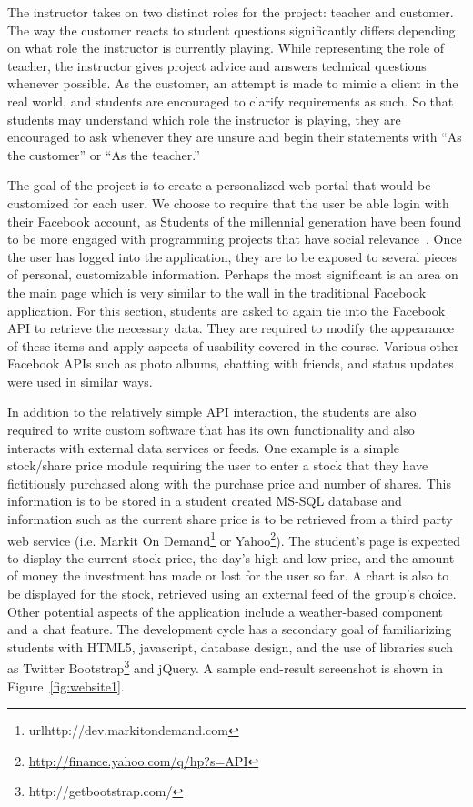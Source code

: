 \documentclass[conference]{IEEEtran}
\begin{document}
The instructor takes on two distinct roles for the project: teacher and customer. The way the customer reacts to student questions significantly differs depending on what role the instructor is currently playing. While representing the role of teacher, the instructor gives project advice and answers technical questions whenever possible. As the customer, an attempt is made to mimic a client in the real world, and students are encouraged to clarify requirements as such. So that students may understand which role the instructor is playing, they are encouraged to ask whenever they are unsure and begin their statements with ``As the customer'' or ``As the teacher.''

The goal of the project is to create a personalized web portal that would be customized for each user. We choose to require that the user be able login with their Facebook account, as Students of the millennial generation have been found to be more engaged with programming projects that have social relevance~\cite{Meneely:2008:RRE:1384271.1384276}. Once the user has logged into the application, they are to be exposed to several pieces of personal, customizable information. Perhaps the most significant is an area on the main page which is very similar to the wall in the traditional Facebook application. For this section, students are asked to again tie into the Facebook API to retrieve the necessary data. They are required to modify the appearance of these items and apply aspects of usability covered in the course. Various other Facebook APIs such as photo albums, chatting with friends, and status updates were used in similar ways.


In addition to the relatively simple API interaction, the students are also required to write custom software that has its own functionality and also interacts with external data services or feeds. One example is a simple stock/share price module requiring the user to enter a stock that they have fictitiously purchased along with the purchase price and number of shares. This information is to be stored in a student created MS-SQL database and information such as the current share price is to be retrieved from a third party web service (i.e. Markit On Demand\footnote{url{http://dev.markitondemand.com}} or Yahoo\footnote{\url{http://finance.yahoo.com/q/hp?s=API}}). The student's page is expected to display the current stock price, the day's high and low price, and the amount of money the investment has made or lost for the user so far. A chart is also to be displayed for the stock, retrieved using an external feed of the group's choice. Other potential aspects of the application include a weather-based component and a chat feature.  The development cycle has a secondary goal of familiarizing students with HTML5, javascript, database design, and the use of libraries such as Twitter Bootstrap\footnote{http://getbootstrap.com/} and jQuery. A sample end-result screenshot is shown in Figure~\ref{fig:website1}.
\end{document}

